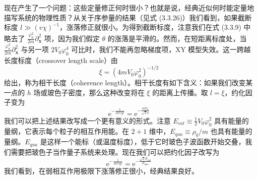 现在产生了一个问题：这些定量修正何时很小？也就是说，经典近似何时能定量地描写系统的物理性质？从关于序参量的结果（见式 (3.3.26)）我们看到，如果截断标度 $l\gg(v\chi)^{-1}$，涨落修正就很小。为得到截断标度，注意我们在式 (3.3.9) 中略去了 $\frac{\varphi_0^2}{2m}\partial_{\pmb{x}}^2$ 项，因为我们假定 $\theta$ 的涨落是平滑的。然而，在短距离标度处，当 $\frac{\varphi_0^2}{2m}\partial_{\pmb{x}}^2$ 与另一项 $2V_0\varphi_0^4$ 可比时，我们不能再忽略梯度项，XY 模型失效。这一跨越长度标度（crossover length scale）由
\begin{equation*}
\xi=(4mV_0\varphi_0^2)^{-1/2}
\end{equation*}
给出，称为相干长度（coherence length）。相干长度有如下含义：如果我们改变某一点的 $h$ 场或玻色子密度，那么这种改变将在 $\xi$ 的距离上传播。取 $l=\xi$，约化因子变为
\begin{equation*}
\mathrm{e}^{-\frac{1}{4\pi v\chi l}}=\mathrm{e}^{-\frac{mV_0}{\sqrt{2}\pi}} \tag{3.3.27}
\end{equation*}
我们可以把上述结果改写成一个更有意义的形式。注意 $E_{int}\equiv\frac{1}{2}V_0\varphi_0^2$ 具有能量的量纲，它表示每个粒子的相互作用能。在 $2+1$ 维中，$E_{qua}\equiv\rho_0/m$ 也具有能量的量纲。$E_{qua}$ 是这样一个能标（或温度标度），低于它时玻色子波函数开始交叠，我们需要把玻色子当作量子系统来处理。现在我们可以把约化因子改写为
\begin{equation*}
\mathrm{e}^{-\frac{1}{4\pi v\chi l}}=\mathrm{e}^{-\frac{\sqrt{2}E_{int}}{E_{qua}}}
\end{equation*}
我们看到，在弱相互作用极限下涨落修正很小，经典结果良好。

